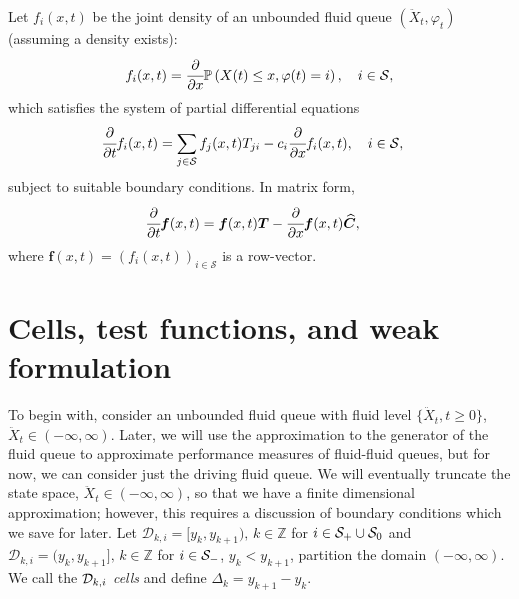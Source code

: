 Let $f_i(x,t)$ be the joint density of an unbounded fluid queue $(\ddot X_t, \varphi_t)$ (assuming a density exists): 
	\begin{align*} 
	    f_i(x,t) = \cfrac{\partial}{\partial x} 	\mathbb{P}\left(X(t) \leq x, \varphi(t) = i\right),\quad i \in\mathcal{S},
	\end{align*} 
which satisfies the system of partial differential equations 
%
\begin{align*}
\cfrac{\partial}{\partial t} f_i(x,t)& = \sum_{j\in \mathcal{S}}  f_j(x,t)T_{ji} - c_i \cfrac{\partial}{\partial x} f_i(x,t), \quad i\in\mathcal S,
\end{align*}
% 
subject to suitable boundary conditions. In matrix form, 
\begin{align}
\cfrac{\partial}{\partial t} \boldsymbol f(x,t) &= \boldsymbol f(x,t)\boldsymbol T -  \cfrac{\partial}{\partial x}\boldsymbol f(x,t)\widehat{\boldsymbol C}\label{eqn:pde_density_matrix}, 
\end{align}
where \(\boldsymbol f(x,t) = \left(f_i(x,t)\right)_{i\in\mathcal S}\) is a row-vector. 

\section{Cells, test functions, and weak formulation}
To begin with, consider an unbounded fluid queue with fluid level \(\{\ddot X_t,t\geq0\}\), \(\ddot X_t\in(-\infty,\infty)\). Later, we will use the approximation to the generator of the fluid queue to approximate performance measures of fluid-fluid queues, but for now, we can consider just the driving fluid queue. We will eventually truncate the state space, \(\ddot X_t\in(-\infty,\infty)\), so that we have a finite dimensional approximation; however, this requires a discussion of boundary conditions which we save for later. Let \(\mathcal D_{k,i} = [y_k,y_{k+1}),\, k\in\mathbb Z\) for \(i\in\mathcal{S}_+\cup\mathcal{S}_0\) and \(\mathcal D_{k,i} = (y_k,y_{k+1}],\, k\in\mathbb Z\) for \(i\in\mathcal{S}_-\), \(y_k<y_{k+1}\), partition the domain \((-\infty,\infty)\). We call the \(\mathcal{D}_{k,i}\) \textit{cells} and define \(\Delta_k=y_{k+1}-y_k\). 

